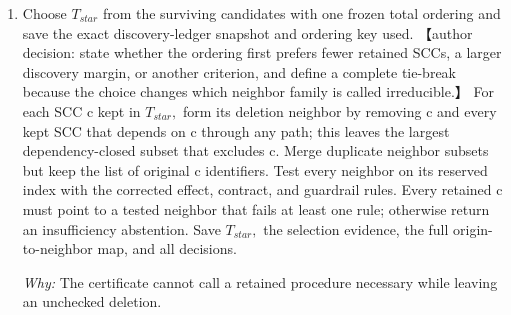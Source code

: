 \documentclass[10pt,a4paper]{article}
\begin{document}
\begin{enumerate}[leftmargin=*,start=8]
\par{}
\noindent\emph{Predictable discovery allocations and sealed family budgets control repeated adaptive queries without reallocating error after outcomes.}
\par{}
\par\emph{Why:} Selection depends on the downstream effect gap to F, not an internal compactness proxy.
  \item Choose \(T_{star}\) from the surviving candidates with one frozen total ordering and save the exact discovery-ledger snapshot and ordering key used. 【author decision: state whether the ordering first prefers fewer retained SCCs, a larger discovery margin, or another criterion, and define a complete tie-break because the choice changes which neighbor family is called irreducible.】 For each SCC c kept in \(T_{star},\) form its deletion neighbor by removing c and every kept SCC that depends on c through any path;\allowbreak{} this leaves the largest dependency-closed subset that excludes c. Merge duplicate neighbor subsets but keep the list of original c identifiers. Test every neighbor on its reserved index with the corrected effect, contract, and guardrail rules. Every retained c must point to a tested neighbor that fails at least one rule;\allowbreak{} otherwise return an insufficiency abstention. Save \(T_{star},\) the selection evidence, the full origin-to-neighbor map, and all decisions.
\par\emph{Why:} The certificate cannot call a retained procedure necessary while leaving an unchecked deletion.
\end{enumerate}
\end{document}
